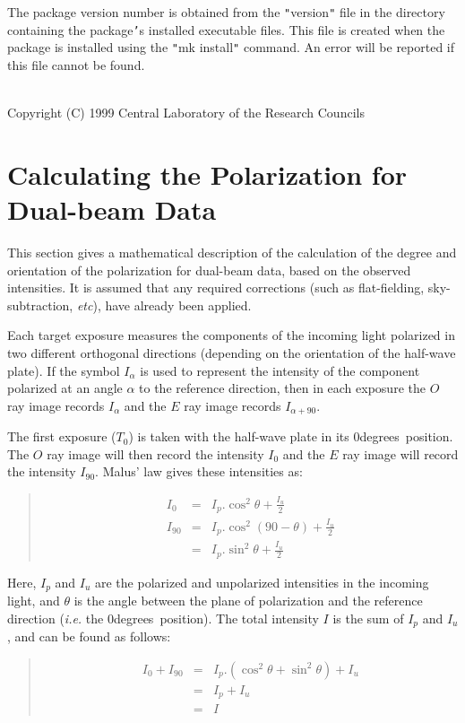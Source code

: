 \documentclass[twoside,11pt]{article}
\newcommand{\stardocinitials}  {SUN}
\newcommand{\stardocnumber}    {223.3}
\newcommand{\stardocname}{\stardocinitials /\stardocnumber}
\newcommand{\xlabel}[1]{}
\renewcommand{\_}{\texttt{\symbol{95}}}
\newenvironment{myquote}{\begin{quote}\begin{small}}{\end{small}\end{quote}}
\newcommand{\dgs}{\hbox{$^\circ$}}
\renewcommand{\dgs}{degrees}
\newcommand{\sstdiytopic}[2]{\item[{\hspace{-0.35em}#1\hspace{-0.35em}:}]
\mbox{} \\[1.3ex] #2}
\newcommand{\sstitem}{\item}
\newcommand{\sstdiytopic}[2]{\item[{#1}] #2 }
\newcommand{\sstitem}{\item}
\begin{document}
{{{         \sstitem
         The package version number is obtained from the {\tt "}version{\tt "} file
         in the directory containing the package{\tt '}s installed executable files.
         This file is created when the package is installed using the {\tt "}mk
         install{\tt "} command. An error will be reported if this file cannot be
         found.
      }
   }
   \sstdiytopic{
      Copyright
   }{
      Copyright (C) 1999 Central Laboratory of the Research Councils
   }
}

\newpage
\markboth{\stardocname}{\stardocname}
\section{\label{APP:POL}\xlabel{calculatingthepolarization}Calculating the Polarization for Dual-beam Data}
This section gives a mathematical description of the calculation of the
degree and orientation of the polarization for dual-beam data, based on
the observed intensities. It is assumed that any required corrections
(such as flat-fielding, sky-subtraction, \emph{etc}), have already been
applied.

Each target exposure measures the components of the incoming light
polarized in two different orthogonal directions (depending on the
orientation of the half-wave plate). If the symbol $I_{\alpha}$ is used
to represent the intensity of the component polarized at an angle
$\alpha$ to the reference direction, then in each exposure the $O$ ray
image records $I_{\alpha}$ and the $E$ ray image records $I_{\alpha+90}$.

The first exposure ($T_{0}$) is taken with the half-wave plate in its 0\dgs\
position. The $O$ ray image will then record the intensity $I_{0}$ and
the $E$ ray image will record the intensity $I_{90}$. Malus' law gives
these intensities as:

\begin{myquote}
\begin{eqnarray*}
  I_{0} & = & I_{p}.\cos^{2}\theta + \frac{I_{u}}{2} \\
 I_{90} & = & I_{p}.\cos^{2}(90 - \theta) + \frac{I_{u}}{2} \\
        & = & I_{p}.\sin^{2}\theta + \frac{I_{u}}{2}
\end{eqnarray*}
\end{myquote}

Here, $I_{p}$ and $I_{u}$ are the polarized and unpolarized intensities
in the incoming light, and $\theta$ is the angle between the plane of
polarization and the reference direction (\emph{i.e.} the 0\dgs\ position). The
total intensity $I$ is the sum of $I_{p}$ and $I_{u}$, and can be found
as follows:
\begin{myquote}
\begin{eqnarray*}
  I_{0} + I_{90} & = & I_{p}.(\cos^{2}\theta + \sin^{2}\theta) + I_{u} \\
                 & = & I_{p} + I_{u} \\
                 & = & I
\end{eqnarray*}
\end{myquote}
\end{document}

